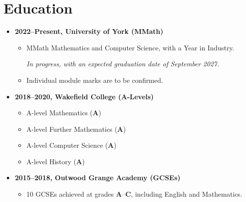 \documentclass{article}
\begin{document}
\section{Education}
\begin{itemize}
        \item \textbf{2022--Present, University of York (MMath)}
        \begin{itemize}
                \item MMath Mathematics and Computer Science, with a Year in
                Industry.

                \textit{In progress, with an expected graduation date of
                September 2027.}

                \item Individual module marks are to be confirmed.
        \end{itemize}
        \item \textbf{2018--2020, Wakefield College (A-Levels)}
        \begin{itemize}
                \item A-level Mathematics (\textbf{A})
                \item A-level Further Mathematics (\textbf{A})
                \item A-level Computer Science (\textbf{A})
                \item A-level History (\textbf{A})
        \end{itemize}
        \item \textbf{2015--2018, Outwood Grange Academy (GCSEs)}
        \begin{itemize}
                \item 10 GCSEs achieved at grades \textbf{A}--\textbf{C},
                including English and Mathematics.
        \end{itemize}
\end{itemize}

%
%
\end{document}
